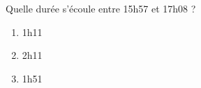 
\begin{exercice}\label{exo2smath-0238}

    Quelle durée s'écoule entre 15h57 et 17h08 ?
    \begin{enumerate}
        \item
            1h11
        \item
            2h11
        \item
            1h51
    \end{enumerate}

\end{exercice}
